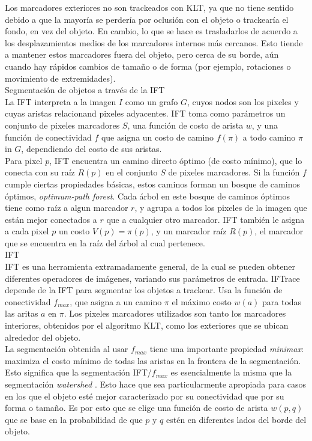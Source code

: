 \documentclass[a4paper,10pt]{article}
\begin{document}
Los marcadores exteriores no son trackeados con KLT, ya que no tiene sentido debido
a que la mayoría se perdería por oclusión con el objeto o trackearía el fondo, en 
vez del objeto. En cambio, lo que se hace es trasladarlos de acuerdo a los 
desplazamientos medios de los marcadores internos más cercanos. Esto tiende
a mantener estos marcadores fuera del objeto, pero cerca de su borde, aún cuando
hay rápidos cambios de tamaño o de forma (por ejemplo, rotaciones o movimiento de extremidades).\\


Segmentación de objetos a través de la IFT\\
La IFT interpreta a la imagen $I$ como un grafo $G$, cuyos nodos son los pixeles y cuyas
aristas relacionand pixeles adyacentes. IFT toma como parámetros un conjunto de 
pixeles marcadores $S$, una función de costo de arista $w$, y una función de 
conectividad $f$ que asigna un costo de camino $f(\pi)$ a todo camino $\pi$ in $G$,
dependiendo del costo de sus aristas.\\
Para pixel $p$, IFT encuentra un camino directo óptimo (de costo mínimo), que lo 
conecta con su raíz $R(p)$ en el conjunto $S$ de pixeles marcadores. Si la función 
$f$ cumple ciertas propiedades básicas, estos caminos forman un bosque de caminos 
óptimos, \textit{optimum-path forest}. Cada árbol en este bosque de caminos óptimos
tiene como raíz a algun marcador $r$, y agrupa a todos los pixeles de la imagen que 
están mejor conectados a $r$ que a cualquier otro marcador. IFT también le asigna a 
cada pixel $p$ un costo $V(p) = \pi(p)$, y un marcador raíz $R(p)$, el marcador 
que se encuentra en la raíz del árbol al cual pertenece.\\

IFT\\
IFT es una herramienta extramadamente general, de la cual se pueden obtener diferentes
operadores de imágenes, variando sus parámetros de entrada. IFTrace depende de la IFT
para segmentar los objetos a trackear. Usa la función de conectividad $f_{max}$, que
asigna a un camino $\pi$ el máximo costo $w(a)$ para todas las aritas $a$ en $\pi$.
Los pixeles marcadores utilizados son tanto los marcadores interiores, obtenidos
por el algoritmo KLT, como los exteriores que se ubican alrededor del objeto.\\
La segmentación obtenida al usar $f_{max}$ tiene una importante propiedad 
\textit{minimax}: maximiza el costo mínimo de todas las aristas en la frontera de la 
segmentación. Esto significa que la segmentación IFT/$f_{max}$ es esencialmente
la misma que la segmentación \textit{watershed} \cite{watershed-segmentation}. Esto 
hace que sea particularmente apropiada para casos en los que el objeto esté 
mejor caracterizado por su conectividad que por su forma o tamaño. Es por esto que 
se elige una función de costo de arista $w(p,q)$ que se base en la probabilidad de 
que $p$ y $q$ estén en diferentes lados del borde del objeto.\\
\end{document}
